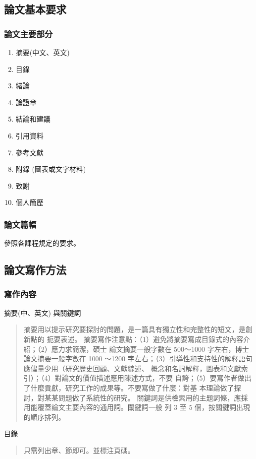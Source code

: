 \documentclass[
    writingLanguage=chinese, %
    addPageTitle=on,  %
    addDeclaration=on, %
    addMUSTlog=off, %
    addFigTOC=on, %
    addTabTOC=on, %
    refIndent=off, %
    printMod=off, %
]{must}
\begin{document}
\subsection{論文基本要求}
\subsubsection{論文主要部分}

\begin{enumerate}
    \item 摘要(中文、英文)
    \item 目錄
    \item 緒論
    \item 論證章
    \item 結論和建議
    \item 引用資料
    \item 參考文獻
    \item 附錄 (圖表或文字材料)
    \item 致謝
    \item 個人簡歷
\end{enumerate}

\subsubsection{論文篇幅}
參照各課程規定的要求。

\subsection{論文寫作方法}
\subsubsection{寫作內容}
\noindent\faHandORight 摘要(中、英文) 與關鍵詞
\begin{quote}
摘要用以提示研究要探討的問題，是一篇具有獨立性和完整性的短文，是創新點的
扼要表述。
摘要寫作注意點：（1）避免將摘要寫成目錄式的內容介紹；（2）應力求簡潔，碩士
論文摘要一般字數在 500～1000 字左右，博士論文摘要一般字數在 1000 ～1200
字左右；（3）引導性和支持性的解釋語句應儘量少用（研究歷史回顧、文獻綜述、
概念和名詞解釋，圖表和文獻索引）；（4）對論文的價值描述應用陳述方式，不要
自誇；（5）要寫作者做出了什麼貢獻，研究工作的成果等。不要寫做了什麼：對基
本理論做了探討，對某某問題做了系統性的研究。
關鍵詞是供檢索用的主題詞條，應採用能覆蓋論文主要內容的通用詞。關鍵詞一般
列 3 至 5 個，按關鍵詞出現的順序排列。
\end{quote}


\noindent\faHandORight 目錄
\begin{quote}
 只需列出章、節即可。並標注頁碼。
    
\end{quote}
\end{document}

